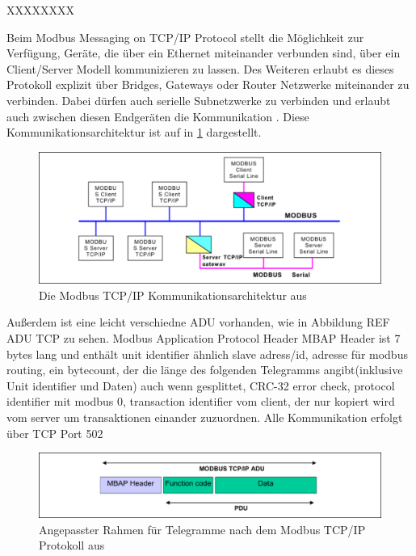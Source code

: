 XXXXXXXX

Beim Modbus Messaging on TCP/IP Protocol stellt die Möglichkeit zur Verfügung, Geräte, die über ein Ethernet miteinander verbunden sind, über ein Client/Server Modell kommunizieren zu lassen. Des Weiteren erlaubt es dieses Protokoll explizit über Bridges, Gateways oder Router Netzwerke miteinander zu verbinden. Dabei dürfen auch serielle Subnetzwerke zu verbinden und erlaubt auch zwischen diesen Endgeräten die Kommunikation \cite[S.~2f.]{mod06tcp}.
Diese Kommunikationsarchitektur ist auf in \ref{fig:tcparchiktektur} dargestellt. 

\begin{figure}
\centering
\includegraphics[width=\textwidth]{abbildungen/20160322_tcparchitektur}
\caption[Die Modbus TCP/IP Kommunikationsarchitektur]{Die Modbus TCP/IP Kommunikationsarchitektur aus \cite[S.~4]{mod06tcp}}
\label{fig:tcparchiktektur}
\end{figure}

Außerdem ist eine leicht verschiedne ADU vorhanden, wie in Abbildung REF ADU TCP zu sehen. Modbus Application Protocol Header MBAP Header ist 7 bytes lang und enthält unit identifier ähnlich slave adress/id, adresse für modbus routing, ein bytecount, der die länge des folgenden Telegramms angibt(inklusive Unit identifier und Daten) auch wenn gesplittet, CRC-32 error check, protocol identifier mit modbus 0, transaction identifier vom client, der nur kopiert wird vom server um transaktionen einander zuzuordnen. Alle Kommunikation erfolgt über TCP Port 502 \cite[S.~4f.]{mod06tcp}

\begin{figure}
\centering
\includegraphics[width=\textwidth]{abbildungen/20160322_tcpframe}
\caption[Angepasster Rahmen für Telegramme nach dem Modbus TCP/IP Protokoll]{Angepasster Rahmen für Telegramme nach dem Modbus TCP/IP Protokoll aus \cite[S.~4]{mod06tcp}}
\label{fig:modbustcpframe}
\end{figure}

